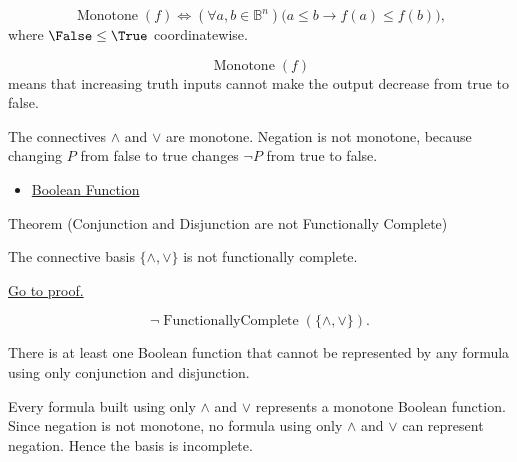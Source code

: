 \begin{remark*}
\[
\operatorname{Monotone}(f)
\Longleftrightarrow
(\forall a,b\in\mathbb{B}^n)
\bigl(a\le b\to f(a)\le f(b)\bigr),
\]
where \(\False\le\True\) coordinatewise.
\end{remark*}

\begin{remark*}
\[
  \operatorname{Monotone}(f)
\] means that increasing truth inputs cannot make the
output decrease from true to false.
\end{remark*}

\begin{remark*}[Interpretation]
The connectives \(\land\) and \(\lor\) are monotone. Negation is not monotone,
because changing \(P\) from false to true changes \(\neg P\) from true to false.
\end{remark*}

\begin{dependencies}
\begin{itemize}
  \item \hyperref[def:boolean-function-propositional-logic]{Boolean Function}
\end{itemize}
\end{dependencies}

\begin{theorembox}{Theorem (Conjunction and Disjunction are not Functionally Complete)}
\begin{theorem}
\label{thm:conjunction-disjunction-not-functionally-complete-propositional-logic}
The connective basis \(\{\land,\lor\}\) is not functionally complete.

\noindent\hyperref[prf:conjunction-disjunction-not-functionally-complete-propositional-logic]{Go to proof.}
\end{theorem}
\end{theorembox}

\begin{remark*}
\[
\neg\operatorname{FunctionallyComplete}(\{\land,\lor\}).
\]
\end{remark*}



\begin{remark*}[Interpretation]
There is at least one Boolean function that cannot be represented by any formula
using only conjunction and disjunction.

Every formula built using only \(\land\) and \(\lor\) represents a monotone
Boolean function. Since negation is not monotone, no formula using only
\(\land\) and \(\lor\) can represent negation. Hence the basis is incomplete.
\end{remark*}

